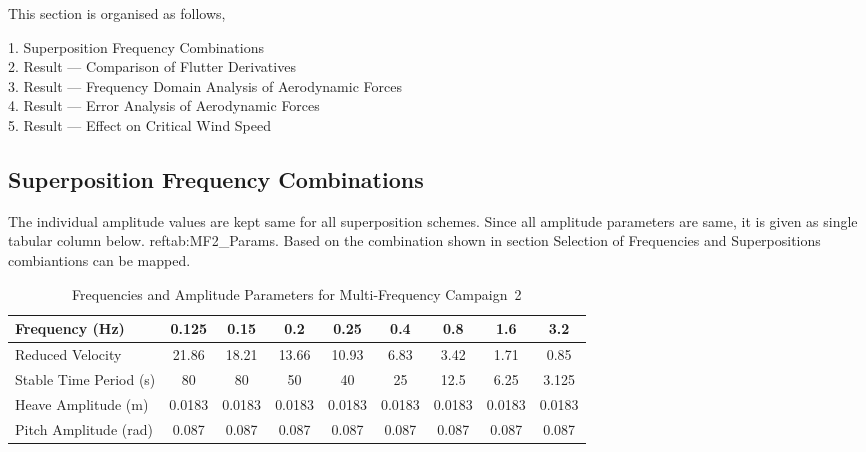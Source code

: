 \documentclass[../main]{subfiles}
\begin{document}
This section is organised as follows, 

\begin{flushleft}
\hspace{2cm}1. Superposition Frequency Combinations \\
\hspace{2cm}2. Result --- Comparison of Flutter Derivatives \\
\hspace{2cm}3. Result --- Frequency Domain Analysis of Aerodynamic Forces \\
\hspace{2cm}4. Result --- Error Analysis of Aerodynamic Forces \\
\hspace{2cm}5. Result --- Effect on Critical Wind Speed \\
\end{flushleft}

\subsection{Superposition Frequency Combinations}

The individual amplitude values are kept same for all superposition schemes. 
Since all amplitude parameters are same, it is given as single tabular column below. 
ref{tab:MF2_Params}. Based on the combination shown in section {Selection of Frequencies and Superpositions}
combiantions can be mapped. 

\begin{table}[htbp]
\centering
\caption{Frequencies and Amplitude Parameters for Multi-Frequency Campaign~2}
\label{tab:MF2_Params}
\begin{tabular}{|l|cccccccc|}
\hline
\rule{0pt}{12pt}\textbf{Frequency (Hz)} & 0.125 & 0.15 & 0.2 & 0.25 & 0.4 & 0.8 & 1.6 & 3.2 \\[4pt]
\hline
Reduced Velocity        & 21.86 & 18.21 & 13.66 & 10.93 & 6.83 & 3.42 & 1.71 & 0.85 \\
Stable Time Period (s)  & 80    & 80    & 50    & 40    & 25   & 12.5 & 6.25 & 3.125 \\
Heave Amplitude (m)     & 0.0183 & 0.0183 & 0.0183 & 0.0183 & 0.0183 & 0.0183 & 0.0183 & 0.0183 \\
Pitch Amplitude (rad)   & 0.087 & 0.087 & 0.087 & 0.087 & 0.087 & 0.087 & 0.087 & 0.087 \\
\hline
\end{tabular}
\end{table}
\end{document}
